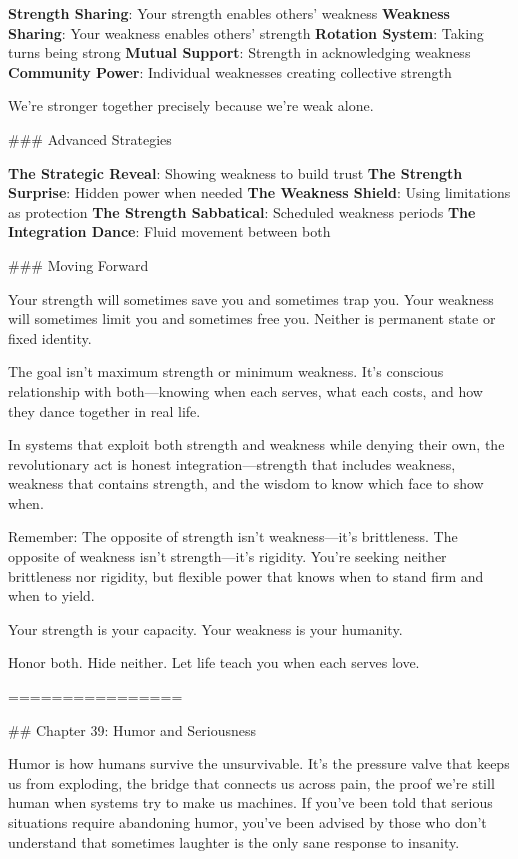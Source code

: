 \documentclass[12pt]{book}
\begin{document}
\textbf{Strength Sharing}: Your strength enables others' weakness
\textbf{Weakness Sharing}: Your weakness enables others' strength
\textbf{Rotation System}: Taking turns being strong
\textbf{Mutual Support}: Strength in acknowledging weakness
\textbf{Community Power}: Individual weaknesses creating collective strength

We're stronger together precisely because we're weak alone.

\#\#\# Advanced Strategies

\textbf{The Strategic Reveal}: Showing weakness to build trust
\textbf{The Strength Surprise}: Hidden power when needed
\textbf{The Weakness Shield}: Using limitations as protection
\textbf{The Strength Sabbatical}: Scheduled weakness periods
\textbf{The Integration Dance}: Fluid movement between both

\#\#\# Moving Forward

Your strength will sometimes save you and sometimes trap you. Your weakness will sometimes limit you and sometimes free you. Neither is permanent state or fixed identity.

The goal isn't maximum strength or minimum weakness. It's conscious relationship with both—knowing when each serves, what each costs, and how they dance together in real life.

In systems that exploit both strength and weakness while denying their own, the revolutionary act is honest integration—strength that includes weakness, weakness that contains strength, and the wisdom to know which face to show when.

Remember: The opposite of strength isn't weakness—it's brittleness. The opposite of weakness isn't strength—it's rigidity. You're seeking neither brittleness nor rigidity, but flexible power that knows when to stand firm and when to yield.

Your strength is your capacity. Your weakness is your humanity.

Honor both. Hide neither. Let life teach you when each serves love.

================

\#\# Chapter 39: Humor and Seriousness

Humor is how humans survive the unsurvivable. It's the pressure valve that keeps us from exploding, the bridge that connects us across pain, the proof we're still human when systems try to make us machines. If you've been told that serious situations require abandoning humor, you've been advised by those who don't understand that sometimes laughter is the only sane response to insanity.
\end{document}
